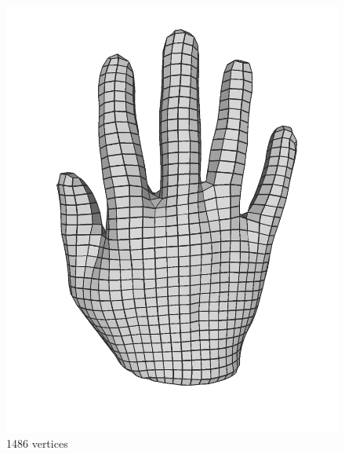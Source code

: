 \begin{figure}
\begin{minipage}{0.24\linewidth}
\includegraphics[width=\linewidth]{quadriflow/evaluation/coarse03.png}
1486 vertices
\end{minipage}
\begin{minipage}{0.24\linewidth}
\centering

\end{minipage}
\end{figure}
